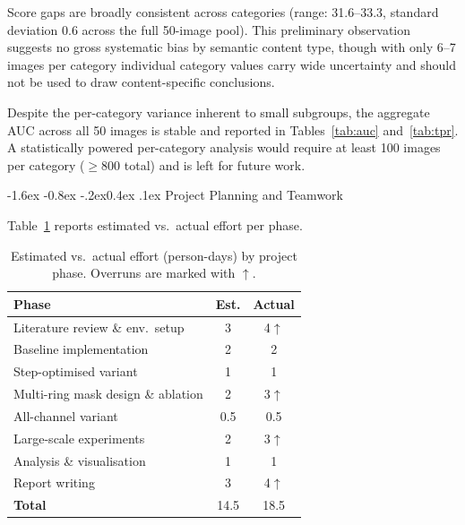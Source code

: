 \documentclass[10pt,twocolumn]{article}
\makeatletter
\renewcommand\subsection{\@startsection{subsection}{2}{\z@}%
  {-1.6ex \@plus -0.8ex \@minus -.2ex}{0.4ex \@plus .1ex}%
  {\normalfont\normalsize\itshape}}
\makeatother
\begin{document}
Score gaps are broadly consistent across categories (range: 31.6--33.3,
standard deviation 0.6 across the full 50-image pool).
This preliminary observation suggests no gross systematic bias by
semantic content type, though with only 6--7 images per category
individual category values carry wide uncertainty and should not be
used to draw content-specific conclusions.

Despite the per-category variance inherent to small subgroups, the
aggregate AUC across all 50 images is stable and reported in
Tables~\ref{tab:auc} and~\ref{tab:tpr}.
A statistically powered per-category analysis would require at least
100 images per category ($\geq$800 total) and is left for future work.

\subsection{Project Planning and Teamwork}

Table~\ref{tab:planning} reports estimated vs.\ actual effort per phase.

\begin{table}[htbp]
  \centering
  \caption{Estimated vs.\ actual effort (person-days) by project phase.
    Overruns are marked with $\uparrow$.}
  \label{tab:planning}
  \setlength{\tabcolsep}{4pt}
  \small
  \begin{tabular}{lcc}
    \toprule
    \textbf{Phase} & \textbf{Est.} & \textbf{Actual} \\
    \midrule
    Literature review \& env.\ setup    & 3   & 4$\uparrow$ \\
    Baseline implementation             & 2   & 2 \\
    Step-optimised variant              & 1   & 1 \\
    Multi-ring mask design \& ablation  & 2   & 3$\uparrow$ \\
    All-channel variant                 & 0.5 & 0.5 \\
    Large-scale experiments             & 2   & 3$\uparrow$ \\
    Analysis \& visualisation           & 1   & 1 \\
    Report writing                      & 3   & 4$\uparrow$ \\
    \midrule
    \textbf{Total}                      & 14.5 & 18.5 \\
    \bottomrule
  \end{tabular}
\end{table}
\end{document}
